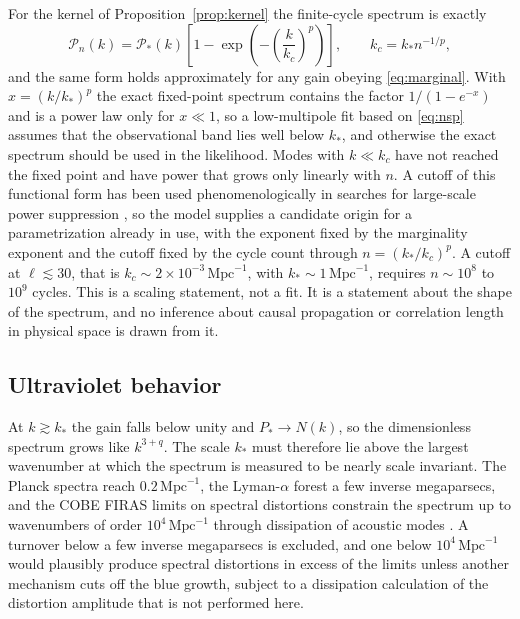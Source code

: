 \documentclass[11pt]{article}
\theoremstyle{definition}
\theoremstyle{remark}
\newcommand{\Pk}{\mathcal{P}}
\begin{document}
For the kernel of Proposition~\ref{prop:kernel} the finite-cycle spectrum is exactly
\begin{equation}
\Pk_n(k)=\Pk_*(k)\left[1-\exp\left(-\left(\frac k{k_c}\right)^p\right)\right],\qquad k_c=k_*n^{-1/p},
\label{eq:suppress}
\end{equation}
and the same form holds approximately for any gain obeying \eqref{eq:marginal}. With $x=(k/k_*)^p$ the exact fixed-point spectrum contains the factor $1/(1-e^{-x})$ and is a power law only for $x\ll1$, so a low-multipole fit based on \eqref{eq:nsp} assumes that the observational band lies well below $k_*$, and otherwise the exact spectrum should be used in the likelihood. Modes with $k\ll k_c$ have not reached the fixed point and have power that grows only linearly with $n$. A cutoff of this functional form has been used phenomenologically in searches for large-scale power suppression \cite{contaldi2003}, so the model supplies a candidate origin for a parametrization already in use, with the exponent fixed by the marginality exponent and the cutoff fixed by the cycle count through $n=(k_*/k_c)^p$. A cutoff at $\ell\lesssim30$, that is $k_c\sim2\times10^{-3}\,\mathrm{Mpc}^{-1}$, with $k_*\sim1\,\mathrm{Mpc}^{-1}$, requires $n\sim10^8$ to $10^9$ cycles. This is a scaling statement, not a fit. It is a statement about the shape of the spectrum, and no inference about causal propagation or correlation length in physical space is drawn from it.

\subsection{Ultraviolet behavior}

At $k\gtrsim k_*$ the gain falls below unity and $P_*\to N(k)$, so the dimensionless spectrum grows like $k^{3+q}$. The scale $k_*$ must therefore lie above the largest wavenumber at which the spectrum is measured to be nearly scale invariant. The Planck spectra reach $0.2\,\mathrm{Mpc}^{-1}$, the Lyman-$\alpha$ forest a few inverse megaparsecs, and the COBE FIRAS limits on spectral distortions constrain the spectrum up to wavenumbers of order $10^4\,\mathrm{Mpc}^{-1}$ through dissipation of acoustic modes \cite{fixsen1996}. A turnover below a few inverse megaparsecs is excluded, and one below $10^4\,\mathrm{Mpc}^{-1}$ would plausibly produce spectral distortions in excess of the limits unless another mechanism cuts off the blue growth, subject to a dissipation calculation of the distortion amplitude that is not performed here.
\end{document}
